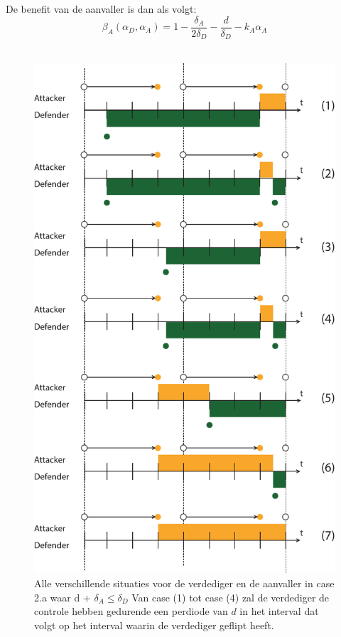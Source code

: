 \documentclass[master=cws, masteroption=vs,english]{kulemt}
\begin{document}
\begin{abstract*}
De benefit van de aanvaller is dan als volgt:
\begin{equation}\label{first}
\beta_{A}(\alpha_{D},\alpha_{A}) = 1 -\dfrac{\delta_{A}}{2\delta_{D}} - \dfrac{d}{\delta_{D}} - k_{A} \alpha_{A} 
\end{equation}\\

\begin{figure}[hbtp]
\centering
\includegraphics[scale=0.5]{../../doc/template/Images/FlipIt2}
\caption{ Alle verschillende situaties voor de verdediger en de aanvaller in case 2.a waar d + $\delta_{A} \leq \delta_{D}$ Van case (1) tot case (4) zal de verdediger de controle hebben gedurende een perdiode van $d$ in het interval dat volgt op het interval waarin de verdediger geflipt heeft.}
\label{fig:case2}
\end{figure}



\end{abstract*}
\end{document}
